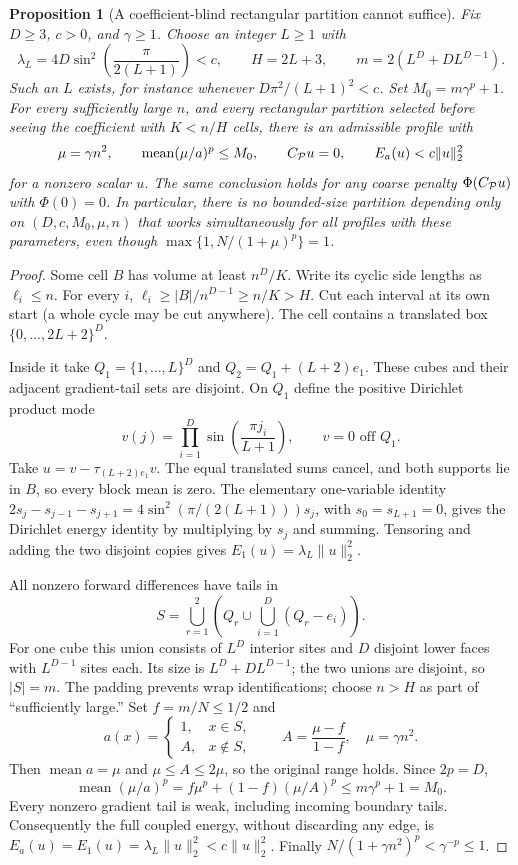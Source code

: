\documentclass[11pt]{article}
\newtheorem{proposition}{Proposition}
\begin{document}
\begin{proposition}[A coefficient-blind rectangular partition cannot suffice]
Fix $D\ge3$, $c>0$, and $\gamma\ge1$. Choose an integer $L\ge1$ with
\[
 \lambda_L=4D\sin^2\!\left(\frac{\pi}{2(L+1)}\right)<c,
 \qquad H=2L+3,
 \qquad m=2(L^D+D L^{D-1}).
\]
Such an $L$ exists, for instance whenever $D\pi^2/(L+1)^2<c$.
Set $M_0=m\gamma^p+1$. For every sufficiently large $n$, and every
rectangular partition selected before seeing the coefficient with $K<n/H$
cells, there is an admissible profile with
\[
 \mu=\gamma n^2,\qquad
 \operatorname{mean}(\mu/a)^p\le M_0,
 \qquad C_{\cal P}u=0,\qquad E_a(u)<c\|u\|_2^2
\]
for a nonzero scalar $u$. The same conclusion holds for any coarse penalty
$\Phi(C_{\cal P}u)$ with $\Phi(0)=0$.
In particular, there is no bounded-size partition depending only on
$(D,c,M_0,\mu,n)$ that works simultaneously for all profiles with these
parameters, even though $\max\{1,N/(1+\mu)^p\}=1$.
\end{proposition}
\begin{proof}
Some cell $B$ has volume at least $n^D/K$. Write its cyclic side lengths
as $\ell_i\le n$. For every $i$,
$\ell_i\ge |B|/n^{D-1}\ge n/K>H$.
Cut each interval at its own start (a whole cycle may be cut anywhere).
The cell contains a translated box $\{0,\ldots,2L+2\}^D$.

Inside it take $Q_1=\{1,\ldots,L\}^D$ and
$Q_2=Q_1+(L+2)e_1$. These cubes and their adjacent gradient-tail sets are
disjoint. On $Q_1$ define the positive Dirichlet product mode
\[
 v(j)=\prod_{i=1}^D\sin\left(\frac{\pi j_i}{L+1}\right),
 \qquad v=0\text{ off }Q_1.
\]
Take $u=v-\tau_{(L+2)e_1}v$. The equal translated sums cancel, and both
supports lie in $B$, so every block mean is zero. The elementary one-variable
identity $2s_j-s_{j-1}-s_{j+1}=4\sin^2(\pi/(2(L+1)))s_j$,
with $s_0=s_{L+1}=0$, gives the Dirichlet energy identity by multiplying
by $s_j$ and summing. Tensoring and adding the two disjoint copies gives
$E_1(u)=\lambda_L\|u\|_2^2$.

All nonzero forward differences have tails in
\[
 S=\bigcup_{r=1}^2\left(Q_r\cup\bigcup_{i=1}^D(Q_r-e_i)\right).
\]
For one cube this union consists of $L^D$ interior sites and $D$ disjoint
lower faces with $L^{D-1}$ sites each. Its size is $L^D+D L^{D-1}$;
the two unions are disjoint, so $|S|=m$. The padding prevents wrap
identifications; choose $n>H$ as part of ``sufficiently large.''
Set $f=m/N\le1/2$ and
\[
 a(x)=\begin{cases}1,&x\in S,\\ A,&x\notin S,\end{cases}
 \qquad A=\frac{\mu-f}{1-f},\quad \mu=\gamma n^2.
\]
Then $\operatorname{mean}a=\mu$ and $\mu\le A\le2\mu$, so the original
range holds. Since $2p=D$,
\[
 \operatorname{mean}(\mu/a)^p
 =f\mu^p+(1-f)(\mu/A)^p
 \le m\gamma^p+1=M_0.
\]
Every nonzero gradient tail is weak, including incoming boundary tails.
Consequently the full coupled energy, without discarding any edge, is
$E_a(u)=E_1(u)=\lambda_L\|u\|_2^2<c\|u\|_2^2$.
Finally $N/(1+\gamma n^2)^p<\gamma^{-p}\le1$.
\end{proof}
\end{document}
